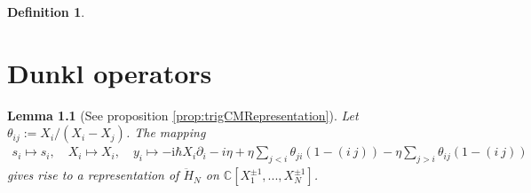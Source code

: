 \documentclass[11pt]{report}
\newtheorem{lemma}[theorem]{Lemma}
\theoremstyle{definition}
\newtheorem{definition}[theorem]{Definition}
\theoremstyle{remark}
\theoremstyle{remark}
\newcommand{\C}{\mathbb{C}}
\newcommand{\I}{\mathrm{i}}
\begin{document}
\begin{definition}
\begin{enumerate}[label=(\roman*)]
\end{enumerate}
\end{definition}

\chapter{Dunkl operators}\label{appendix:dunklOperators}

\begin{lemma}[See proposition \ref{prop:trigCMRepresentation}]\label{lemma:trigCMRepresentationAppendix}
Let $\theta_{ij} := X_i/(X_i-X_j)$. The mapping
\begin{align*}
s_i \mapsto s_i, \quad X_i \mapsto X_i, \quad y_i \mapsto -\I \hbar X_i \partial_i - i \eta + \eta \sum_{j < i} \theta_{ji} (1-(i \ j)) - \eta \sum_{j > i} \theta_{ij} (1-(i \ j))
\end{align*}
gives rise to a representation of $\ddot H_N$ on $\C[X_1^{\pm 1},...,X_N^{\pm 1}]$.
\end{lemma}
\end{document}
